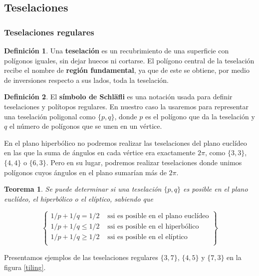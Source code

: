 \documentclass{article}
\theoremstyle{plain}
\newtheorem{theorem}{Teorema}
\theoremstyle{definition}
\newtheorem{definition}{Definición}
\theoremstyle{remark}
\begin{document}
\subsection{Teselaciones}
\subsubsection{Teselaciones regulares}
\begin{definition}
  Una \textbf{teselación} es un recubrimiento de una superficie con
  polígonos iguales, sin dejar huecos ni cortarse. El polígono central
  de la teselación recibe el nombre de \textbf{región fundamental}, ya que de
  este se obtiene, por medio de inversiones respecto a sus lados, toda
  la teselación.
\end{definition}

\begin{definition}
  El \textbf{símbolo de Schläfli} es una notación usada para definir
  teselaciones y polítopos regulares. En nuestro caso la usaremos para
  representar una teselación poligonal como $\{p,q\}$, donde $p$ es el
  polígono que da la teselación y $q$ el número de polígonos que se unen
  en un vértice.
\end{definition}

En el plano hiperbólico no podremos realizar las teselaciones del
plano euclídeo en las que la suma de ángulos en cada vértice era
exactamente $2\pi$, como $\{3,3\}$, $\{4,4\}$ o $\{6,3\}$. Pero en su
lugar, podremos realizar teselaciones donde unimos polígonos cuyos
ángulos en el plano sumarían más de $2\pi$.

\begin{theorem}
  Se puede determinar si una teselación $\{p,q\}$ es posible en el plano
  euclídeo, el hiperbólico o el elíptico, sabiendo que

  \[
    \left\{
      \begin{array}{cc}
        1/p + 1/q = 1/2    &\text{ ssi es posible en el plano euclídeo} \\
        1/p + 1/q \leq 1/2 &\text{ ssi es posible en el hiperbólico} \\
        1/p + 1/q \geq 1/2 &\text{ ssi es posible en el elíptico} \\
      \end{array}
    \right\}
  \]
\end{theorem}

Presentamos ejemplos de las teselaciones regulares $\{3,7\}$, $\{4,5\}$
y $\{7,3\}$ en la figura \ref{tiling}.
\end{document}
